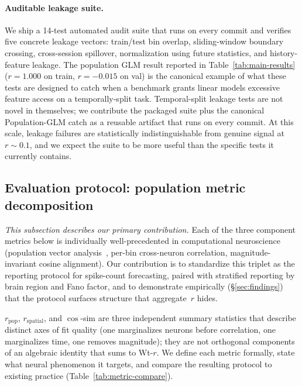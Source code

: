 \documentclass{article}
\begin{document}
\paragraph{Auditable leakage suite.}
We ship a 14-test automated audit suite that runs on every commit and
verifies five concrete leakage vectors: train/test bin overlap,
sliding-window boundary crossing, cross-session spillover,
normalization using future statistics, and history-feature leakage.
The population GLM result reported in Table~\ref{tab:main-results}
($r{=}1.000$ on train, $r{=}{-}0.015$ on val) is the canonical example
of what these tests are designed to catch when a benchmark grants
linear models excessive feature access on a temporally-split task.
Temporal-split leakage tests are not novel in themselves; we
contribute the packaged suite plus the canonical Population-GLM catch
as a reusable artifact that runs on every commit.  At this scale,
leakage failures are statistically indistinguishable from genuine
signal at $r \sim 0.1$, and we expect the suite to be more useful
than the specific tests it currently contains.

\subsection{Evaluation protocol: population metric decomposition}
\label{sec:metrics}

\emph{This subsection describes our primary contribution.}  Each of
the three component metrics below is individually well-precedented in
computational neuroscience (population vector
analysis~\citep{georgopoulos1986neuronal}, per-bin cross-neuron
correlation, magnitude-invariant cosine alignment).  Our contribution
is to standardize this triplet as the reporting protocol for
spike-count forecasting, paired with stratified reporting by brain
region and Fano factor, and to demonstrate empirically
(\S\ref{sec:findings}) that the protocol surfaces structure that
aggregate~$r$ hides.

$r_\mathrm{pop}$, $r_\mathrm{spatial}$, and $\cos$-sim are three
independent summary statistics that describe distinct axes of fit
quality (one marginalizes neurons before correlation, one
marginalizes time, one removes magnitude); they are not orthogonal
components of an algebraic identity that sums to Wt-$r$.  We define
each metric formally, state what neural phenomenon it targets, and
compare the resulting protocol to existing practice
(Table~\ref{tab:metric-compare}).
\end{document}
